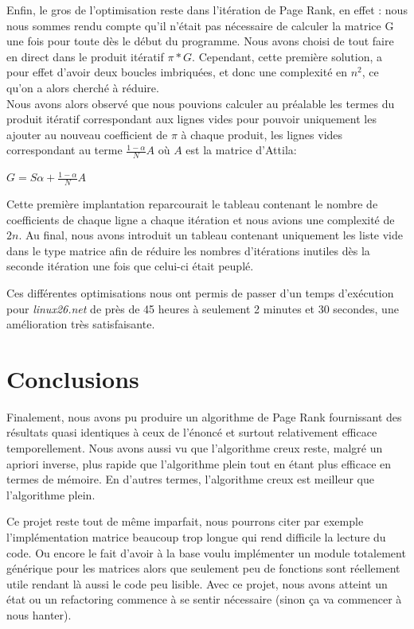 \documentclass{NewTeX}
\begin{document}
Enfin, le gros de l'optimisation reste dans l'itération de Page Rank, en effet :  nous nous sommes rendu compte qu'il n'était pas nécessaire de calculer la matrice G une fois pour toute dès le début du programme. Nous avons choisi de tout faire en direct dans le produit itératif $\pi * G$. Cependant, cette première solution, a pour effet d'avoir deux boucles imbriquées, et donc une complexité en $n^2$, ce qu'on a alors cherché à réduire.  \\ 
Nous avons alors observé que nous pouvions calculer au préalable les termes du produit itératif correspondant aux lignes vides pour pouvoir uniquement les ajouter au nouveau coefficient de $\pi$ à chaque produit, les lignes vides correspondant au terme $\frac{1-\alpha }{N}A$ où $A$ est la matrice d'Attila: \\
\begin{center}
$G = S\alpha + \frac{1-\alpha }{N}A $
\end{center}
Cette première implantation reparcourait le tableau contenant le nombre de coefficients de chaque ligne a chaque itération et nous avions une complexité de $2n$.  Au final, nous avons introduit un tableau contenant uniquement les liste vide dans le type matrice afin de réduire les nombres d'itérations inutiles dès la seconde itération une fois que celui-ci était peuplé.

Ces différentes optimisations nous ont permis de passer d'un temps d'exécution pour \textit{linux26.net} de près de 45 heures à seulement 2 minutes et 30 secondes, une amélioration très satisfaisante.  

\section{Conclusions}

Finalement, nous avons pu produire un algorithme de Page Rank fournissant des résultats quasi identiques à ceux de l'énoncé et surtout relativement efficace temporellement. Nous avons aussi vu que l'algorithme creux reste, malgré un apriori inverse, plus rapide que l'algorithme plein tout en étant plus efficace en termes de mémoire. En d'autres termes, l'algorithme creux est meilleur que l'algorithme plein.

Ce projet reste tout de même imparfait, nous pourrons citer par exemple l'implémentation matrice beaucoup trop longue qui rend difficile la lecture du code. Ou encore le fait d'avoir à la base voulu implémenter un module totalement générique pour les matrices alors que seulement peu de fonctions sont réellement utile rendant là aussi le code peu lisible. Avec ce projet, nous avons atteint un état ou un refactoring commence à se sentir nécessaire (sinon ça va commencer à nous hanter).
\end{document}
